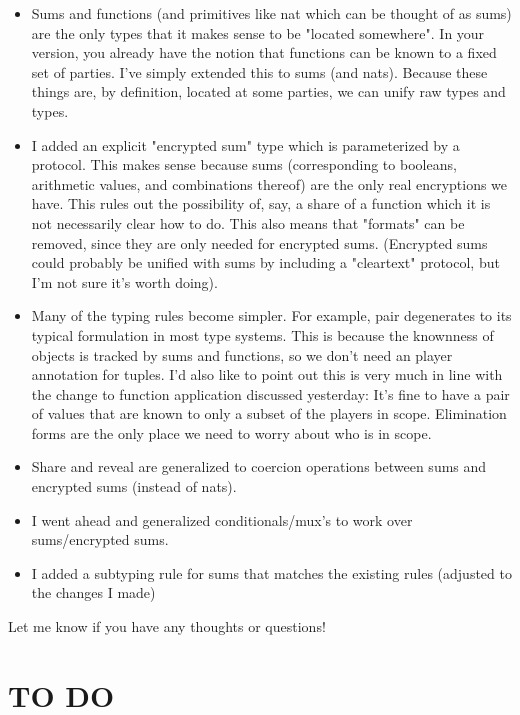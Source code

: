 \documentclass[10pt]{article}
\begin{document}
\begin{itemize}
\item Sums and functions (and primitives like nat which can be thought of as sums) are the only types that it makes sense to be "located somewhere". In your version, you already have the notion that functions can be known to a fixed set of parties. I've simply extended this to sums (and nats). Because these things are, by definition, located at some parties, we can unify raw types and types.

\item I added an explicit "encrypted sum" type which is parameterized by a protocol. This makes sense because sums (corresponding to booleans, arithmetic values, and combinations thereof) are the only real encryptions we have. This rules out the possibility of, say, a share of a function which it is not necessarily clear how to do. This also means that "formats" can be removed, since they are only needed for encrypted sums. (Encrypted sums could probably be unified with sums by including a "cleartext" protocol, but I'm not sure it's worth doing).

\item Many of the typing rules become simpler. For example, pair degenerates to its typical formulation in most type systems. This is because the knownness of objects is tracked by sums and functions, so we don't need an player annotation for tuples. I'd also like to point out this is very much in line with the change to function application discussed yesterday: It's fine to have a pair of values that are known to only a subset of the players in scope. Elimination forms are the only place we need to worry about who is in scope.

\item Share and reveal are generalized to coercion operations between sums and encrypted sums (instead of nats).

\item I went ahead and generalized conditionals/mux's to work over sums/encrypted sums.

\item I added a subtyping rule for sums that matches the existing rules (adjusted to the changes I made)
\end{itemize}

Let me know if you have any thoughts or questions!

\section{TO DO}
\end{document}
